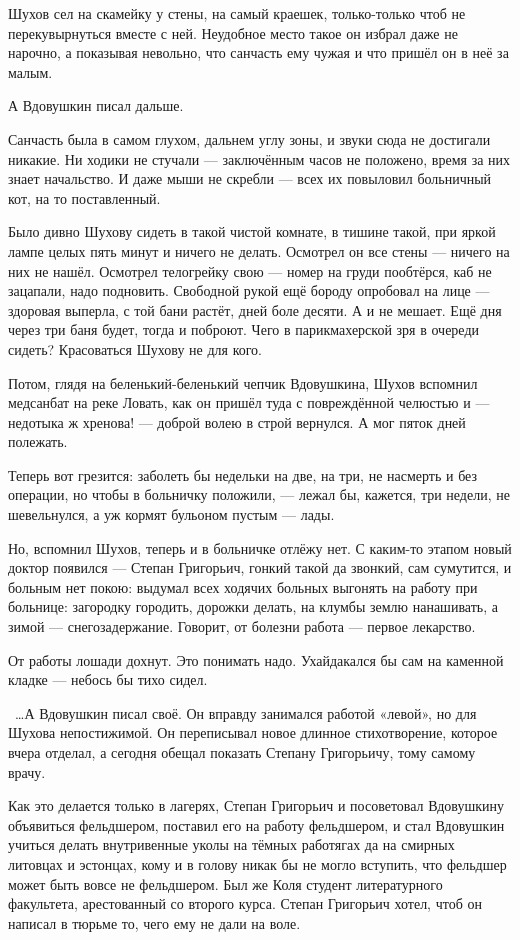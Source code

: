 Шухов сел на скамейку у стены, на самый краешек, только-только чтоб не перекувырнуться 
вместе с ней. Неудобное место такое он избрал даже не нарочно, а показывая невольно, что 
санчасть ему чужая и что пришёл он в неё за малым.

А Вдовушкин писал дальше.

Санчасть была в самом глухом, дальнем углу зоны, и звуки сюда не достигали никакие. Ни ходики 
не стучали --- заключённым часов не положено, время за них знает начальство. И даже мыши не 
скребли --- всех их повыловил больничный кот, на то поставленный.

Было дивно Шухову сидеть в такой чистой комнате, в тишине такой, при яркой лампе целых пять 
минут и ничего не делать. Осмотрел он все стены --- ничего на них не нашёл. Осмотрел телогрейку 
свою --- номер на груди пообтёрся, каб не зацапали, надо подновить. Свободной рукой ещё бороду 
опробовал на лице --- здоровая выперла, с той бани растёт, дней боле десяти. А и не мешает. Ещё 
дня через три баня будет, тогда и поброют. Чего в парикмахерской зря в очереди сидеть? 
Красоваться Шухову не для кого.

Потом, глядя на беленький-беленький чепчик Вдовушкина, Шухов вспомнил медсанбат на реке 
Ловать, как он пришёл туда с повреждённой челюстью и --- недотыка ж хренова! --- доброй волею в 
строй вернулся. А мог пяток дней полежать.

Теперь вот грезится: заболеть бы недельки на две, на три, не насмерть и без операции, но чтобы 
в больничку положили, --- лежал бы, кажется, три недели, не шевельнулся, а уж кормят бульоном 
пустым --- лады.

Но, вспомнил Шухов, теперь и в больничке отлёжу нет. С каким-то этапом новый доктор появился 
--- Степан Григорьич, гонкий такой да звонкий, сам сумутится, и больным нет покою: выдумал всех 
ходячих больных выгонять на работу при больнице: загородку городить, дорожки делать, на 
клумбы землю нанашивать, а зимой --- снегозадержание. Говорит, от болезни работа --- первое 
лекарство.

От работы лошади дохнут. Это понимать надо. Ухайдакался бы сам на каменной кладке --- небось 
бы тихо сидел.

~\dots{}А Вдовушкин писал своё. Он вправду занимался работой «левой», но для Шухова 
непостижимой. Он переписывал новое длинное стихотворение, которое вчера отделал, а сегодня 
обещал показать Степану Григорьичу, тому самому врачу.

Как это делается только в лагерях, Степан Григорьич и посоветовал Вдовушкину объявиться 
фельдшером, поставил его на работу фельдшером, и стал Вдовушкин учиться делать внутривенные 
уколы на тёмных работягах да на смирных литовцах и эстонцах, кому и в голову никак бы не 
могло вступить, что фельдшер может быть вовсе не фельдшером. Был же Коля студент 
литературного факультета, арестованный со второго курса. Степан Григорьич хотел, чтоб он 
написал в тюрьме то, чего ему не дали на воле.

